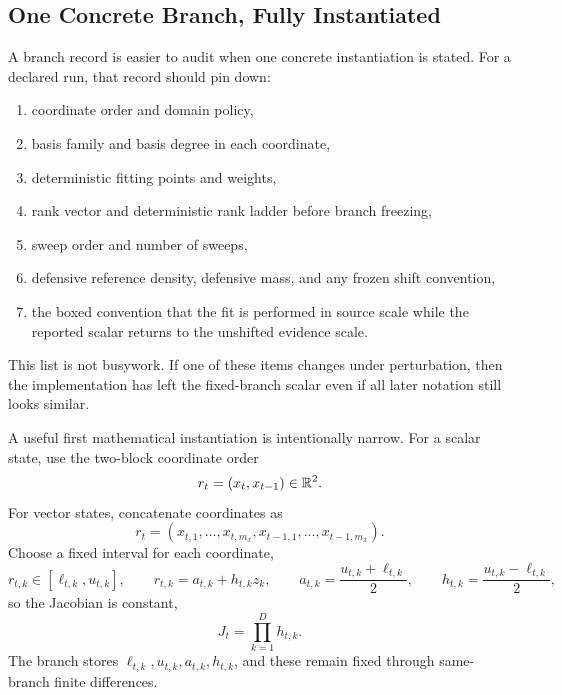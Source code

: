 \subsection{One Concrete Branch, Fully Instantiated}
\label{sec:bf-hd-squared-tt-concrete-branch}

A branch record is easier to audit when one concrete instantiation is stated.
For a declared run, that record should pin down:
\begin{enumerate}[leftmargin=0.28in]
  \item coordinate order and domain policy,
  \item basis family and basis degree in each coordinate,
  \item deterministic fitting points and weights,
  \item rank vector and deterministic rank ladder before branch freezing,
  \item sweep order and number of sweeps,
  \item defensive reference density, defensive mass, and any frozen shift
  convention,
  \item the boxed convention that the fit is performed in source scale while the
  reported scalar returns to the unshifted evidence scale.
\end{enumerate}
This list is not busywork.  If one of these items changes under perturbation,
then the implementation has left the fixed-branch scalar even if all later
notation still looks similar.

A useful first mathematical instantiation is intentionally narrow.  For a scalar
state, use the two-block coordinate order
\begin{equation}
  r_t=(x_t,x_{t-1})\in\mathbb{R}^2.
  \label{eq:bf-hd-squared-tt-concrete-order}
\end{equation}
For vector states, concatenate coordinates as
\begin{equation}
  r_t=(x_{t,1},\ldots,x_{t,m_x},x_{t-1,1},\ldots,x_{t-1,m_x}).
  \label{eq:bf-hd-squared-tt-concrete-vector-order}
\end{equation}
Choose a fixed interval for each coordinate,
\begin{equation}
  r_{t,k}\in[\ell_{t,k},u_{t,k}],
  \qquad
  r_{t,k}=a_{t,k}+h_{t,k}z_k,
  \qquad
  a_{t,k}=\frac{u_{t,k}+\ell_{t,k}}2,
  \qquad
  h_{t,k}=\frac{u_{t,k}-\ell_{t,k}}2,
  \label{eq:bf-hd-squared-tt-concrete-domain}
\end{equation}
so the Jacobian is constant,
\begin{equation}
  J_t=\prod_{k=1}^Dh_{t,k}.
  \label{eq:bf-hd-squared-tt-concrete-jacobian}
\end{equation}
The branch stores \(\ell_{t,k},u_{t,k},a_{t,k},h_{t,k}\), and these remain fixed
through same-branch finite differences.

